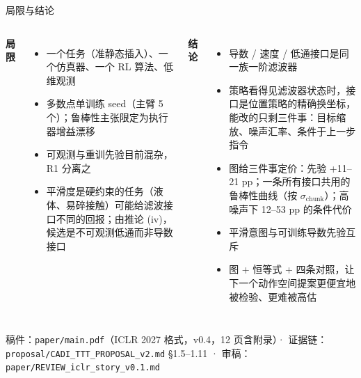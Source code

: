 \documentclass[10pt,aspectratio=169]{beamer}
\newcommand{\schunk}{\sigma_{\mathrm{chunk}}}
\begin{document}
\begin{frame}{局限与结论}
\begin{columns}[T]
\textbf{局限}
\begin{itemize}
\item 一个任务（准静态插入）、一个仿真器、一个 RL 算法、低维观测
\item 多数点单训练 seed（主臂 5 个）；鲁棒性主张限定为执行器增益漂移
\item 可观测与重训先验目前混杂，R1 分离之
\item 平滑度是硬约束的任务（液体、易碎接触）可能给滤波接口不同的回报；由推论 (iv)，候选是不可观测低通而非导数接口
\end{itemize}
\textbf{结论}
\begin{itemize}
\item 导数 / 速度 / 低通接口是同一族一阶滤波器
\item 策略看得见滤波器状态时，接口是位置策略的精确换坐标，能改的只剩三件事：目标缩放、噪声汇率、条件于上一步指令
\item 图给三件事定价：先验 +11–21 pp；一条所有接口共用的鲁棒性曲线（按 $\schunk$）；高噪声下 12–53 pp 的条件代价
\item 平滑意图与可训练导数先验互斥
\item 图 + 恒等式 + 四条对照，让下一个动作空间提案更便宜地被检验、更难被高估
\end{itemize}
\end{columns}
\vspace{2mm}
\centering\small 稿件：\texttt{paper/main.pdf}（ICLR 2027 格式，v0.4，12 页含附录）· 证据链：\texttt{proposal/CADI\_TTT\_PROPOSAL\_v2.md} §1.5--1.11 · 审稿：\texttt{paper/REVIEW\_iclr\_story\_v0.1.md}
\end{frame}
\end{document}
